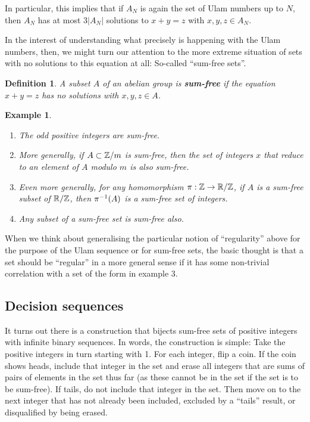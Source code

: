 \documentclass{report}
\newtheorem{definition}[theorem]{Definition}
\newtheorem{example}{Example}
\theoremstyle{remark}
\numberwithin{equation}{section}
\begin{document}
In particular, this implies that if $A_N$ is again the set of Ulam
numbers up to $N$, then $A_N$ has at most $3|A_N|$ solutions to $x+y =
z$ with $x, y, z \in A_N$.  

In the interest of understanding what precisely is happening with the
Ulam numbers, then, we might turn our attention to the more extreme
situation of sets with no solutions to this equation at all: So-called
``sum-free sets''.  

\begin{definition}
  A subset $A$ of an abelian group is \textbf{sum-free} if the
  equation $x+y=z$ has no solutions with $x, y, z \in A$.
\end{definition}

\begin{example}
\begin{enumerate}
\item The odd positive integers are sum-free.  
\item More generally, if $A \subset \mathbb{Z}/m$ is sum-free, then the set of
  integers $x$ that reduce to an element of $A$ modulo $m$ is also
  sum-free.  
\item Even more generally, for any homomorphism $\pi : \mathbb{Z} \to \mathbb{R}/\mathbb{Z}$,
  if $A$ is a sum-free subset of $\mathbb{R}/\mathbb{Z}$, then $\pi^{-1}(A)$ is a
  sum-free set of integers.
\item Any subset of a sum-free set is sum-free also.
\end{enumerate}
\end{example}

When we think about generalising the particular notion of
``regularity'' above for the purpose of the Ulam sequence or for
sum-free sets, the basic thought is that a set should be ``regular''
in a more general sense if it has some non-trivial correlation with a
set of the form in example 3.

\subsection{Decision sequences}

It turns out there is a construction that bijects sum-free sets of
positive integers with infinite binary sequences.  In words, the
construction is simple: Take the positive integers in turn starting
with 1.  For each integer, flip a coin.  If the coin shows heads,
include that integer in the set and erase all integers that are sums
of pairs of elements in the set thus far (as these cannot be in the
set if the set is to be sum-free).  If tails, do not include that
integer in the set.  Then move on to the next integer that has not
already been included, excluded by a ``tails'' result, or disqualified
by being erased.
\end{document}
